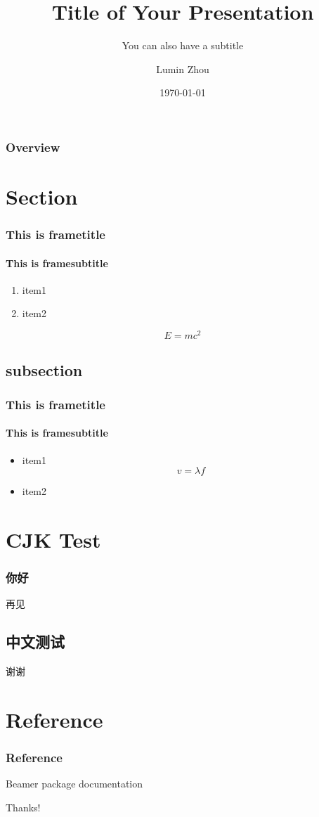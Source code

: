 \documentclass{beamer}
\title{Title of Your Presentation}
\subtitle{You can also have a subtitle}
\author{Lumin Zhou}
\institute{Example Organization}
\date{\today}
\begin{document}
\begin{CJK}{UTF8}{gkai}

\begin{frame}
 \titlepage
\end{frame}

\begin{frame}
 \frametitle{Overview}
 \tableofcontents
\end{frame}

\section{Section}

\begin{frame}
 \frametitle{This is frametitle}
 \framesubtitle{This is framesubtitle}
 \begin{enumerate}
  \item item1
  \item item2
 \end{enumerate}
 \[ E = mc^2 \]
\end{frame}

\subsection{subsection}

\begin{frame}
 \frametitle{This is frametitle}
 \framesubtitle{This is framesubtitle}
 \begin{itemize}
  \item item1
   \[ v = \lambda f \]
  \item item2
 \end{itemize}
\end{frame}

\section{CJK Test}

\begin{frame}
 \frametitle{你好}
 再见
\end{frame}

\subsection{中文测试}

\begin{frame}
 谢谢
\end{frame}

\section{Reference}

\begin{frame}
 \frametitle{Reference}
 \begin{thebibliography}{10}
   Beamer package documentation
 \end{thebibliography}
\end{frame}

\begin{frame}
 \centering \Huge Thanks!
\end{frame}

\end{CJK}
\end{document}
